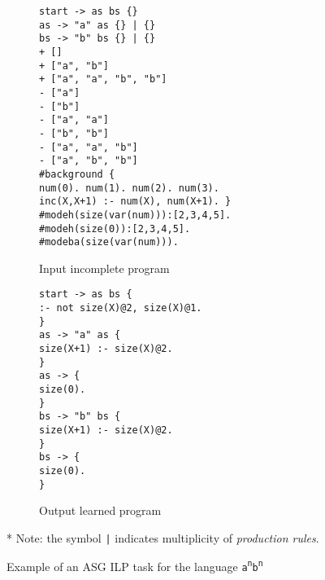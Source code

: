 \begin{figure}[H]
\centering
\begin{subfigure}{0.55\textwidth}
\texttt{start -> as bs \{\} \\
as -> "a" as \{\} | \{\} \\
bs -> "b" bs \{\} | \{\} \\
\newline
+ [] \\
+ ["a", "b"] \\
+ ["a", "a", "b", "b"] \\
- ["a"] \\
- ["b"] \\
- ["a", "a"] \\
- ["b", "b"] \\
- ["a", "a", "b"] \\
- ["a", "b", "b"] \\
\newline
\#background \{ \\
num(0). num(1). num(2). num(3). \\
inc(X,X+1) :- num(X), num(X+1). \} \\
\newline
\#modeh(size(var(num))):[2,3,4,5]. \\
\#modeh(size(0)):[2,3,4,5]. \\
\#modeba(size(var(num))). \\}
\caption{Input incomplete program}
\end{subfigure}
\begin{subfigure}{0.44\textwidth}
\texttt{start -> as bs \{ \\
\phantom{ }:- not size(X)@2, size(X)@1. \\
\} \\
\newline
as -> "a" as \{ \\
\phantom{ }size(X+1) :- size(X)@2. \\
\} \\
\newline
as -> \{ \\
\phantom{ }size(0). \\
\} \\
\newline
bs -> "b" bs \{ \\
\phantom{ }size(X+1) :- size(X)@2. \\
\} \\
\newline
bs -> \{ \\
\phantom{ }size(0). \\
\}} \\
\caption{Output learned program}
\end{subfigure}
\newline
\newline
* Note: the symbol \texttt{|} indicates multiplicity of \textit{production rules}.
\caption{Example of an ASG ILP task for the language \texttt{a\textsuperscript{n}b\textsuperscript{n}}}
\label{fig:asg_ilp_example}
\end{figure}

